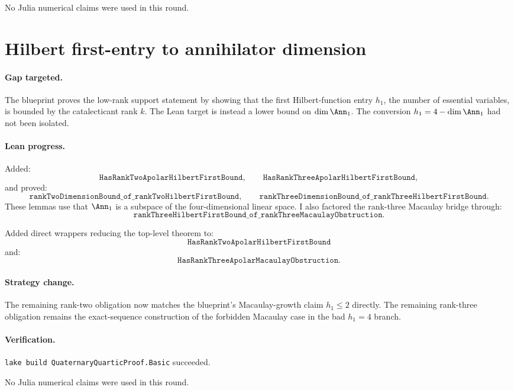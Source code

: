 \documentclass[11pt]{article}
\begin{document}
No Julia numerical claims were used in this round.

\section*{Hilbert first-entry to annihilator dimension}

\paragraph{Gap targeted.}
The blueprint proves the low-rank support statement by showing that the first
Hilbert-function entry \(h_1\), the number of essential variables, is bounded
by the catalecticant rank \(k\).  The Lean target is instead a lower bound on
\(\dim\Ann_1\).  The conversion \(h_1=4-\dim\Ann_1\) had not been isolated.

\paragraph{Lean progress.}
Added:
\[
\texttt{HasRankTwoApolarHilbertFirstBound},
\qquad
\texttt{HasRankThreeApolarHilbertFirstBound},
\]
and proved:
\[
\texttt{rankTwoDimensionBound\_of\_rankTwoHilbertFirstBound},
\qquad
\texttt{rankThreeDimensionBound\_of\_rankThreeHilbertFirstBound}.
\]
These lemmas use that \(\Ann_1\) is a subspace of the four-dimensional linear
space.  I also factored the rank-three Macaulay bridge through:
\[
\texttt{rankThreeHilbertFirstBound\_of\_rankThreeMacaulayObstruction}.
\]

Added direct wrappers reducing the top-level theorem to:
\[
\texttt{HasRankTwoApolarHilbertFirstBound}
\]
and:
\[
\texttt{HasRankThreeApolarMacaulayObstruction}.
\]

\paragraph{Strategy change.}
The remaining rank-two obligation now matches the blueprint's Macaulay-growth
claim \(h_1\le2\) directly.  The remaining rank-three obligation remains the
exact-sequence construction of the forbidden Macaulay case in the bad
\(h_1=4\) branch.

\paragraph{Verification.}
\texttt{lake build QuaternaryQuarticProof.Basic} succeeded.

No Julia numerical claims were used in this round.
\end{document}
